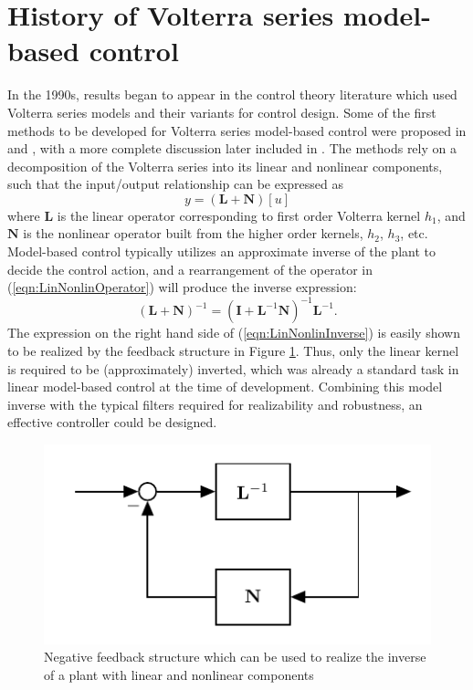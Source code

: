 \section{History of Volterra series model-based control}

In the 1990s, results began to appear in the control theory literature which used Volterra series models and their variants for control design. Some of the first methods to be developed for Volterra series model-based control were proposed in \cite{Maner1994} and \cite{Doyle1995}, with a more complete discussion later included in \cite{Doyle2002}. The methods rely on a decomposition of the Volterra series into its linear and nonlinear components, such that the input/output relationship can be expressed as
\begin{equation}
y = (\mathbf{L}+\mathbf{N}) [u]
\label{eqn:LinNonlinOperator}
\end{equation}
where $\mathbf{L}$ is the linear operator corresponding to first order Volterra kernel $h_1$, and $\mathbf{N}$ is the nonlinear operator built from the higher order kernels, $h_2$, $h_3$, etc. Model-based control typically utilizes an approximate inverse of the plant to decide the control action, and a rearrangement of the operator in (\ref{eqn:LinNonlinOperator}) will produce the inverse expression:
\begin{equation}
(\mathbf{L}+\mathbf{N})^{-1} = (\mathbf{I} + \mathbf{L}^{-1}\mathbf{N})^{-1} \mathbf{L}^{-1}.
\label{eqn:LinNonlinInverse}
\end{equation}
The expression on the right hand side of (\ref{eqn:LinNonlinInverse}) is easily shown to be realized by the feedback structure in Figure \ref{fig:LinNonlinInvRealization}. Thus, only the linear kernel is required to be (approximately) inverted, which was already a standard task in linear model-based control at the time of development. Combining this model inverse with the typical filters required for realizability and robustness, an effective controller could be designed. 

\begin{figure}[h]
\centering
\includegraphics[scale = 1]{Chapter10_NMPC/VolterraIMC.pdf}
\caption{Negative feedback structure which can be used to realize the inverse of a plant with linear and nonlinear components}
\label{fig:LinNonlinInvRealization}
\end{figure}

